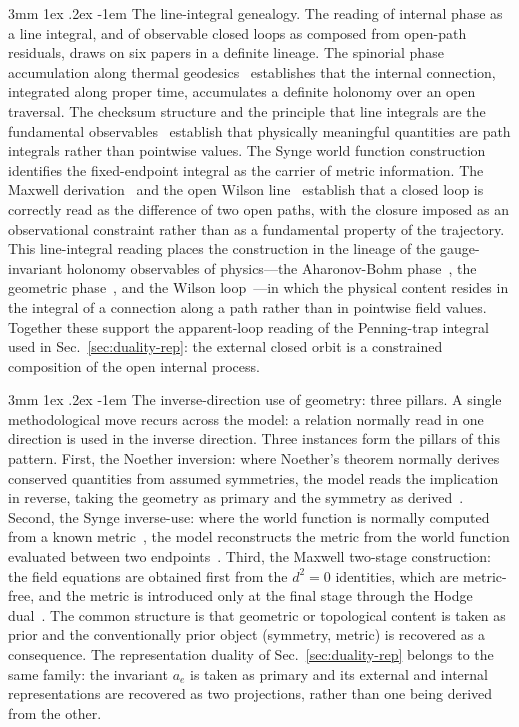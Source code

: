 \documentclass[%
 reprint, amsmath,amssymb, aps, prb, ]{revtex4-2}
\makeatletter
\numberwithin{equation}{section}
\renewcommand\paragraph{%
  \@startsection{paragraph}{4}{\z@}%
    {3mm \@plus 1ex \@minus .2ex}%
    {-1em}%
    {\normalfont\normalsize\itshape}}
\makeatother
\begin{document}
\paragraph{The line-integral genealogy.}
The reading of internal phase as a line integral, and of observable closed loops as composed from open-path residuals, draws on six papers in a definite lineage. The spinorial phase accumulation along thermal geodesics~\cite{hanamura29} establishes that the internal connection, integrated along proper time, accumulates a definite holonomy over an open traversal. The checksum structure and the principle that line integrals are the fundamental observables~\cite{hanamura30,hanamura31} establish that physically meaningful quantities are path integrals rather than pointwise values. The Synge world function construction~\cite{synge1960,hanamura51} identifies the fixed-endpoint integral as the carrier of metric information. The Maxwell derivation~\cite{hanamura54} and the open Wilson line~\cite{wilson1974,hanamura55} establish that a closed loop is correctly read as the difference of two open paths, with the closure imposed as an observational constraint rather than as a fundamental property of the trajectory. This line-integral reading places the construction in the lineage of the gauge-invariant holonomy observables of physics---the Aharonov-Bohm phase~\cite{aharonovbohm1959}, the geometric phase~\cite{berry1984}, and the Wilson loop~\cite{wilson1974}---in which the physical content resides in the integral of a connection along a path rather than in pointwise field values. Together these support the apparent-loop reading of the Penning-trap integral used in Sec.~\ref{sec:duality-rep}: the external closed orbit is a constrained composition of the open internal process.

\paragraph{The inverse-direction use of geometry: three pillars.}
A single methodological move recurs across the model: a relation normally read in one direction is used in the inverse direction. Three instances form the pillars of this pattern. First, the Noether inversion: where Noether's theorem normally derives conserved quantities from assumed symmetries, the model reads the implication in reverse, taking the geometry as primary and the symmetry as derived~\cite{hanamura25}. Second, the Synge inverse-use: where the world function is normally computed from a known metric~\cite{synge1960}, the model reconstructs the metric from the world function evaluated between two endpoints~\cite{hanamura51}. Third, the Maxwell two-stage construction: the field equations are obtained first from the $d^2=0$ identities, which are metric-free, and the metric is introduced only at the final stage through the Hodge dual~\cite{hanamura54}. The common structure is that geometric or topological content is taken as prior and the conventionally prior object (symmetry, metric) is recovered as a consequence. The representation duality of Sec.~\ref{sec:duality-rep} belongs to the same family: the invariant $a_e$ is taken as primary and its external and internal representations are recovered as two projections, rather than one being derived from the other.
\end{document}
